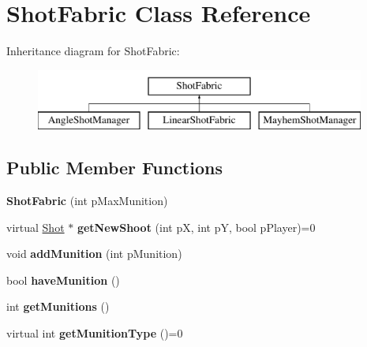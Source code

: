 \hypertarget{class_shot_fabric}{\section{Shot\-Fabric Class Reference}
\label{class_shot_fabric}
}
Inheritance diagram for Shot\-Fabric\-:\begin{figure}[H]
\begin{center}
\leavevmode
\includegraphics[height=2.000000cm]{class_shot_fabric}
\end{center}
\end{figure}
\subsection*{Public Member Functions}
\begin{DoxyCompactItemize}
\item 
\hypertarget{class_shot_fabric_af16f37a0f8bd2d7c92adc41af55d35fa}{{\bfseries Shot\-Fabric} (int p\-Max\-Munition)}\label{class_shot_fabric_af16f37a0f8bd2d7c92adc41af55d35fa}

\item 
\hypertarget{class_shot_fabric_a08f334290a4ef5dfd67964c35467344f}{virtual \hyperlink{class_shot}{Shot} $\ast$ {\bfseries get\-New\-Shoot} (int p\-X, int p\-Y, bool p\-Player)=0}\label{class_shot_fabric_a08f334290a4ef5dfd67964c35467344f}

\item 
\hypertarget{class_shot_fabric_a5cf24e648d9bb4dcafe30be3df7e64f8}{void {\bfseries add\-Munition} (int p\-Munition)}\label{class_shot_fabric_a5cf24e648d9bb4dcafe30be3df7e64f8}

\item 
\hypertarget{class_shot_fabric_a1f09703a48a7dc51c177dab863c14a17}{bool {\bfseries have\-Munition} ()}\label{class_shot_fabric_a1f09703a48a7dc51c177dab863c14a17}

\item 
\hypertarget{class_shot_fabric_a733c2e929d1ac1a30453e32af1874cbe}{int {\bfseries get\-Munitions} ()}\label{class_shot_fabric_a733c2e929d1ac1a30453e32af1874cbe}

\item 
\hypertarget{class_shot_fabric_a5744630f76e016e21ba141bd182d16ad}{virtual int {\bfseries get\-Munition\-Type} ()=0}\label{class_shot_fabric_a5744630f76e016e21ba141bd182d16ad}

\end{DoxyCompactItemize}
